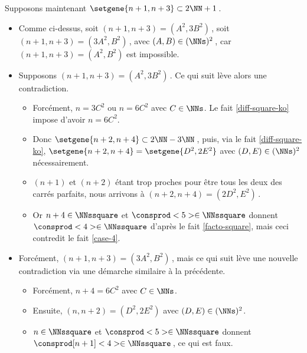 Supposons maintenant $\setgene{n + 1, n + 3} \subset 2 \NN + 1$\,.
%	
\begin{itemize}
	\item
	Comme ci-dessus,
	soit $(n + 1, n + 3) = (A^2, 3 B^2)$\,,
	soit $(n + 1, n + 3) = (3 A^2, B^2)$\,,
	avec $(A, B) \in ( \NNs )^2$\,,
	car $(n + 1, n + 3) = (A^2, B^2)$ est impossible.
	
	\item Supposons $(n + 1, n + 3) = (A^2, 3 B^2)$\,. Ce qui suit lève alors une contradiction.
	\begin{itemize}
		\item Forcément, $n = 3 C^2$ ou $n = 6 C^2$ avec $C \in \NNs$.
		Le fait \ref{diff-square-ko} impose d'avoir $n = 6 C^2$.

		\item Donc 
		$\setgene{n + 2, n + 4} \subset 2 \NN - 3 \NN$\,, 
		puis, via le fait \ref{diff-square-ko},
		$\setgene{n + 2, n + 4} = \setgene{D^2, 2 E^2}$ 
		avec $(D, E) \in ( \NNs )^2$ nécessairement.

		\item $(n+1)$ et $(n+2)$ étant trop proches pour être tous les deux des carrés parfaits, nous arrivons à $(n + 2, n + 4) = (2 D^2, E^2)$\,.

		\item Or $n + 4 \in \NNssquare$ et $\consprod<5> \in \NNssquare$ donnent $\consprod<4> \in \NNssquare$ d'après le fait \ref{facto-square}, mais ceci contredit le fait \ref{case-4}.
	\end{itemize}
	
	\item Forcément, $(n + 1, n + 3) = (3 A^2, B^2)$\,, mais ce qui suit lève une nouvelle contradiction via une démarche similaire à la précédente.
	\begin{itemize}
		\item Forcément, $n + 4 = 6 C^2$ avec $C \in \NNs$. 

		\item Ensuite, $(n, n + 2) = (D^2, 2 E^2)$ avec $(D, E) \in ( \NNs )^2$.

		\item $n \in \NNssquare$ et $\consprod<5> \in \NNssquare$ donnent $\consprod[n+1]<4> \in \NNssquare$\,, ce qui est faux.\qedhere
	\end{itemize}
\end{itemize}